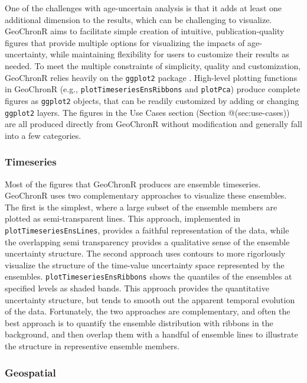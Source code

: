 \documentclass[gc, manuscript]{copernicus}
\begin{document}
One of the challenges with age-uncertain analysis is that it adds at least one additional dimension to the results, which can be challenging to visualize.
GeoChronR aims to facilitate simple creation of intuitive, publication-quality figures that provide multiple options for visualizing the impacts of age-uncertainty, while maintaining flexibility for users to customize their results as needed.
To meet the multiple constraints of simplicity, quality and customization, GeoChronR relies heavily on the \texttt{ggplot2} package \citep{ggplot2}.
High-level plotting functions in GeoChronR (e.g., \texttt{plotTimeseriesEnsRibbons} and \texttt{plotPca}) produce complete figures as \texttt{ggplot2} objects, that can be readily customized by adding or changing \texttt{ggplot2} layers.
The figures in the Use Cases section (Section @(sec:use-cases)) are all produced directly from GeoChronR without modification and generally fall into a few categories.

\subsubsection{Timeseries}

Most of the figures that GeoChronR produces are ensemble timeseries.
GeoChronR uses two complementary approaches to visualize these ensembles.
The first is the simplest, where a large subset of the ensemble members are plotted as semi-transparent lines.
This approach, implemented in \texttt{plotTimeseriesEnsLines}, provides a faithful representation of the data, while the overlapping semi transparency provides a qualitative sense of the ensemble uncertainty structure.
The second approach uses contours to more rigorlously visualize the structure of the time-value uncertainty space represented by the ensembles.
\texttt{plotTimeseriesEnsRibbons} shows the quantiles of the ensembles at specified levels as shaded bands.
This approach provides the quantitative uncertainty structure, but tends to smooth out the apparent temporal evolution of the data.
Fortunately, the two approaches are complementary, and often the best approach is to quantify the ensemble distribution with ribbons in the background, and then overlap them with a handful of ensemble lines to illustrate the structure in representive ensemble members.

\subsubsection{Geospatial}
\end{document}
